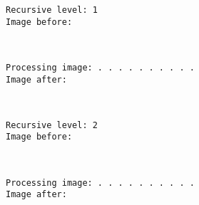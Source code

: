 \documentclass[11pt]{article}
\begin{document}
    \begin{Verbatim}[commandchars=\\\{\}]
Recursive level: 1
Image before:

    \end{Verbatim}

    \begin{center}
    \end{center}
    { \hspace*{\fill} \\}
    
    \begin{Verbatim}[commandchars=\\\{\}]
Processing image: . . . . . . . . . . 
Image after:

    \end{Verbatim}

    \begin{center}
    \end{center}
    { \hspace*{\fill} \\}
    
    \begin{Verbatim}[commandchars=\\\{\}]
Recursive level: 2
Image before:

    \end{Verbatim}

    \begin{center}
    \end{center}
    { \hspace*{\fill} \\}
    
    \begin{Verbatim}[commandchars=\\\{\}]
Processing image: . . . . . . . . . . 
Image after:

    \end{Verbatim}

    \begin{center}
    \end{center}
    { \hspace*{\fill} \\}
    
\end{document}
